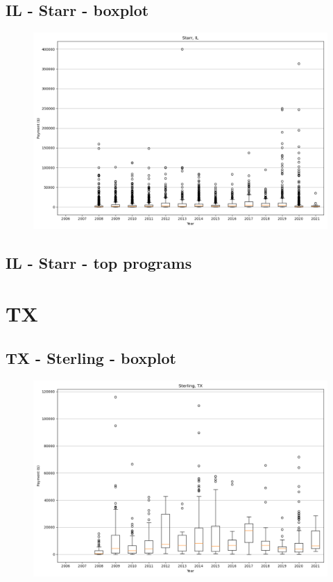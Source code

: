 \subsection*{IL - Starr - boxplot}
\begin{figure}[h]
\centering
\includegraphics[width=7in]{../output/boxplots/counties/Starr-IL_boxplot.png}
\end{figure}


\subsection*{IL - Starr - top programs}

\newpage
\section*{TX}
\subsection*{TX - Sterling - boxplot}
\begin{figure}[h]
\centering
\includegraphics[width=7in]{../output/boxplots/counties/Sterling-TX_boxplot.png}
\end{figure}


